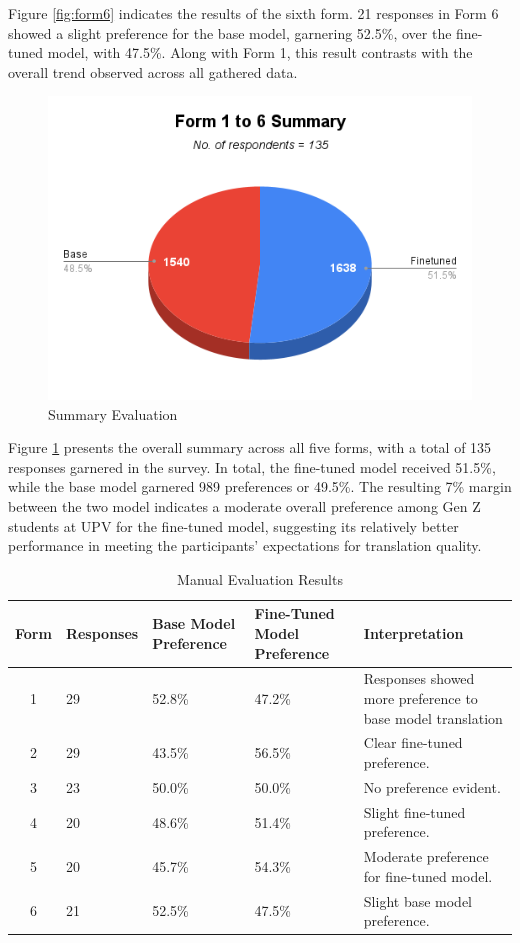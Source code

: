Figure \ref{fig:form6} indicates the results of the sixth form. 21 responses in Form 6 showed a slight preference for the base model, garnering 52.5\%, over the fine-tuned model, with 47.5\%. Along with Form 1, this result contrasts with the overall trend observed across all gathered data.  

\begin{figure}[htbp]
	\centering
	\includegraphics[scale=0.7]{figures/Summary.png}
	\caption{Summary Evaluation}
	\label{fig:summary}	
\end{figure}

Figure \ref{fig:summary} presents the overall summary across all five forms, with a total of 135 responses garnered in the survey. In total, the fine-tuned model received 51.5\%, while the base model garnered 989 preferences or 49.5\%. The resulting 7\% margin between the two model indicates a moderate overall preference among Gen Z students at UPV for the fine-tuned model, suggesting its relatively better performance in meeting the participants' expectations for translation quality. 

\begin{table}
	\centering
	\caption{Manual Evaluation Results}
	\label{tab:summarymanual}
	\begin{tabularx}{\textwidth}{|c|X|X|X|X|}
		\hline
		\textbf{Form} & \textbf{Responses} & \textbf{Base Model Preference} & \textbf{Fine-Tuned Model Preference} & \textbf{Interpretation} \\
		\hline
		1 & 29 & 52.8\% & 47.2\% & Responses showed more preference to base model translation \\
		\hline
		2 & 29 & 43.5\% & 56.5\% & Clear fine-tuned preference. \\
		\hline
		3 & 23 & 50.0\% & 50.0\% & No preference evident. \\
		\hline
		4 & 20 & 48.6\% & 51.4\% & Slight fine-tuned preference. \\
		\hline
		5 & 20 & 45.7\% & 54.3\% & Moderate preference for fine-tuned model. \\
		\hline
		6 & 21 & 52.5\% & 47.5\% & Slight base model preference. \\
		\hline
	\end{tabularx}
\end{table}


